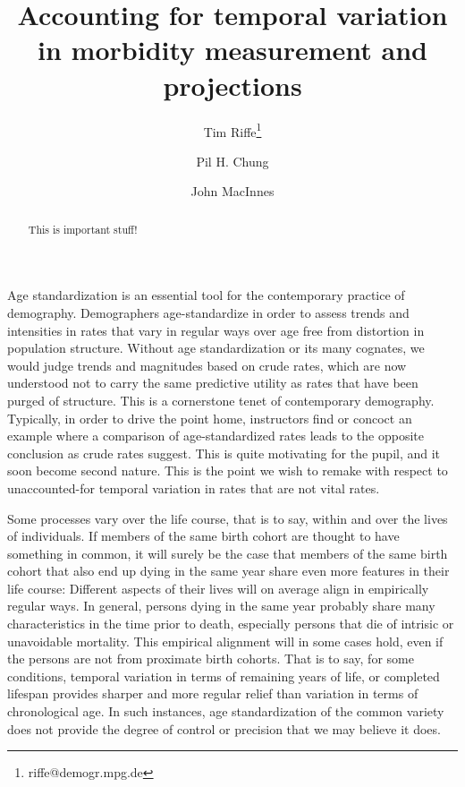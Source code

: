 \documentclass[11pt,oneside,a4paper]{article} %
\begin{document}
\title{Accounting for temporal variation in morbidity measurement
and projections}

\author[1]{Tim Riffe\thanks{riffe@demogr.mpg.de}}
\author[2]{Pil H. Chung}
\author[3]{John MacInnes}


\maketitle

\begin{abstract}
This is important stuff!
\end{abstract}

Age standardization is an essential tool for the contemporary practice of
demography. Demographers age-standardize in order to assess trends and
intensities in rates that vary in regular ways over age free from distortion in
population structure. Without age standardization or its many cognates, we
would judge trends and magnitudes based on crude rates, which are now understood
not to carry the same predictive utility as rates that have been purged of
structure. This is a cornerstone tenet of contemporary demography. Typically, in
order to drive the point home, instructors find or concoct an example where a
comparison of age-standardized rates leads to the opposite conclusion as crude
rates suggest. This is quite motivating for the pupil, and it soon become second
nature. This is the point we wish to remake with respect to unaccounted-for
temporal variation in rates that are not vital rates.

Some processes vary over the life course, that is to say, within and over the
lives of individuals. If members of the same birth cohort are thought to have
something in common, it will surely be the case that members of the same birth
cohort that also end up dying in the same year share even more features in their
life course: Different aspects of their lives will on average align in
empirically regular ways. In general, persons dying in the same year probably
share many characteristics in the time prior to death, especially persons that
die of intrisic or unavoidable mortality. This empirical
alignment will in some cases hold, even if the persons are not from proximate
birth cohorts. That is to say, for some conditions, temporal variation in terms
of remaining years of life, or completed lifespan provides sharper and more
regular relief than variation in terms of chronological age. In such instances,
age standardization of the common variety does not provide the degree of
control or precision that we may believe it does.
\end{document}
